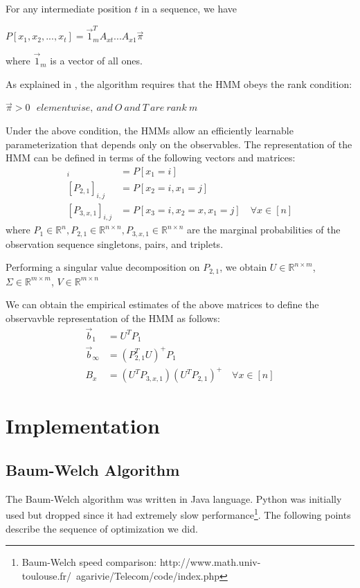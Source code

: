 \documentclass[letterpaper]{article}
\begin{document}
For any intermediate position $t$ in a sequence, we have

\begin{center}
	$P[x_{1}, x_{2}, ..., x_{t}] = \vec1_{m}^{T}A_{xt}...A_{x1}\vec\pi$
\end{center}
where $\vec1_{m}$ is a vector of all ones.

As explained in \cite{semen paper}, the algorithm requires that the HMM obeys the rank condition:
\begin{center}
	$\vec\pi > 0\ \ \ element wise,\ and\ O\ and\ T\ are\ rank\ m$
\end{center}
Under the above condition, the HMMs allow an efficiently learnable parameterization that depends only on the observables. The representation of the HMM can be defined in terms of the following vectors and matrices:
\begin{align*}
	[P_{1}]_{i}       & = P[x_{1} = i]                                         \\
	[P_{2,1}]_{i,j}   & = P[x_{2}=i, x_{1}=j]                                  \\
	[P_{3,x,1}]_{i,j} & = P[x_{3}=i, x_{2}=x, x_{1}=j] \quad \forall x \in [n] 
\end{align*}
where $P_{1} \in \mathbb{R}^{n}, P_{2,1} \in \mathbb{R}^{n \times n}, P_{3,x,1} \in \mathbb{R}^{n \times n}$ are the marginal probabilities of the observation sequence singletons, pairs, and triplets.

Performing a singular value decomposition on $P_{2,1}$, we obtain $U \in \mathbb{R}^{n \times m}$, $\Sigma \in \mathbb{R}^{m \times m}$, $V \in \mathbb{R}^{m \times n}$

We can obtain the empirical estimates of the above matrices to define the observavble representation of the HMM as follows:
\begin{align*}
	\vec b_{1}      & = U^{T}P_{1}                                                 \\
	\vec b_{\infty} & = (P_{2,1}^{T}U)^{+}P_{1}                                    \\
	B_{x}           & = (U^{T}P_{3,x,1})(U^{T}P_{2,1})^{+} \quad \forall x \in [n] 
\end{align*}

\section{Implementation}
\subsection{Baum-Welch Algorithm}
The Baum-Welch algorithm was written in Java language. Python was initially used but dropped since it had extremely slow performance\footnote{Baum-Welch speed comparison: http://www.math.univ-toulouse.fr/~agarivie/Telecom/code/index.php}. The following points describe the sequence of optimization we did.
\end{document}
